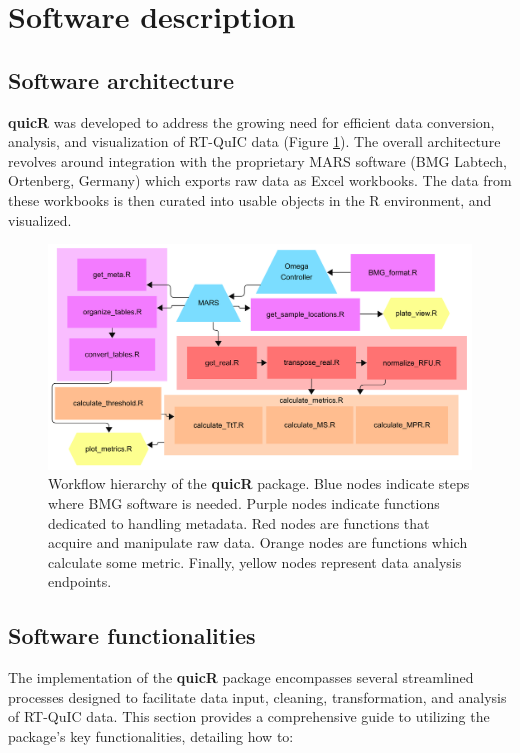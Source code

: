 \documentclass[preprint,12pt,a4paper]{elsarticle}
\begin{document}
    \section{Software description}
        \subsection{Software architecture}
            \textbf{quicR} was developed to address the growing need for efficient data conversion, analysis, and visualization of RT-QuIC data (Figure \ref{fig:workflow}). The overall architecture revolves around integration with the proprietary MARS software (BMG Labtech, Ortenberg, Germany) which exports raw data as Excel workbooks. The data from these workbooks is then curated into usable objects in the R environment, and visualized.

            \begin{figure}[ht]
                \centering
                \includegraphics[width=\textwidth]{images/workflow.png}
                \caption{Workflow hierarchy of the \textbf{quicR} package. Blue nodes indicate steps where BMG software is needed. Purple nodes indicate functions dedicated to handling metadata. Red nodes are functions that acquire and manipulate raw data. Orange nodes are functions which calculate some metric. Finally, yellow nodes represent data analysis endpoints.}
                \label{fig:workflow}
            \end{figure}

        \subsection{Software functionalities}
            The implementation of the \textbf{quicR} package encompasses several streamlined processes designed to facilitate data input, cleaning, transformation, and analysis of RT-QuIC data. This section provides a comprehensive guide to utilizing the package's key functionalities, detailing how to:
                
\end{document}
